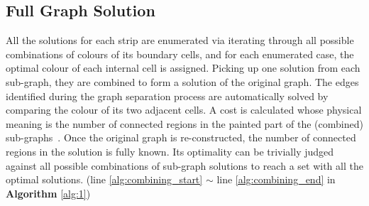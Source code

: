 \documentclass[journal]{IEEEtran}
\begin{document}
\subsection{Full Graph Solution}
All the solutions for each strip are enumerated via iterating through all possible combinations of colours of its boundary cells, and for each enumerated case, the optimal colour of each internal cell is assigned. 
Picking up one solution from each sub-graph, they are combined to form a solution of the original graph. 
The edges identified during the graph separation process are automatically solved by comparing the colour of its two adjacent cells. 
A cost is calculated whose physical meaning is the number of connected regions in the painted part of the (combined) sub-graphs~\cite{Yang2020Cellular}. 
Once the original graph is re-constructed, the number of connected regions in the solution is fully known. 
Its optimality can be trivially judged against all possible combinations of sub-graph solutions to reach a set with all the optimal solutions. (line \ref{alg:combining_start} $\sim$ line \ref{alg:combining_end} in \textbf{Algorithm} \ref{alg:1})
\end{document}
